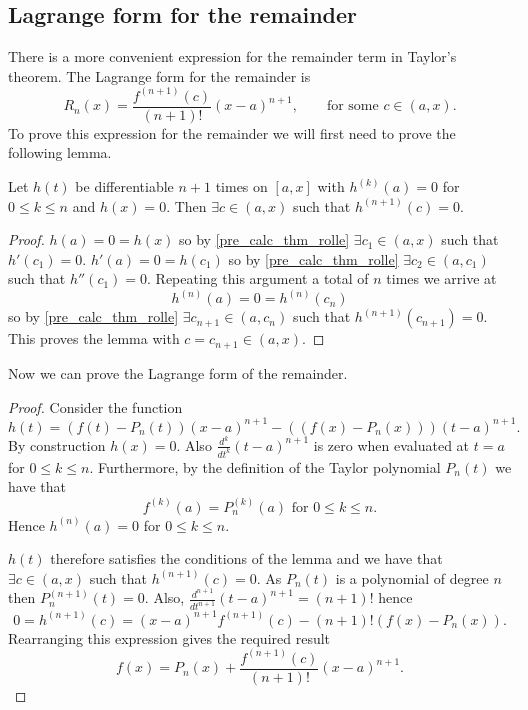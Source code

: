 \documentclass[10pt, a4paper]{article}
\begin{document}
\subsection{Lagrange form for the remainder}
There is a more convenient expression for the remainder term in Taylor's theorem.
The Lagrange form for the remainder is
\[
R_n(x) = \frac{f ^ {(n + 1)}(c)}{(n + 1)!}(x - a) ^ {n + 1},\qquad\text{for some } c \in (a, x).
\]
To prove this expression for the remainder we will first need to prove the following lemma.
\begin{lemma}
    Let $h(t)$ be differentiable $n + 1$ times on $[a, x]$ with $h ^ {(k)}(a) = 0$ for $0 \leq k \leq n$ and $h(x) = 0$.
    Then $\exists c \in (a, x)$ such that $h ^ {(n + 1)}(c) = 0$.

    \begin{proof}
        $h(a) = 0 = h(x)$ so by \autoref{pre_calc_thm_rolle} $\exists c_1 \in (a, x)$ such that $h'(c_1) = 0$.
        $h'(a) = 0 = h(c_1)$ so by \autoref{pre_calc_thm_rolle} $\exists c_2 \in (a, c_1)$ such that $h''(c_1) = 0$.
        Repeating this argument a total of $n$ times we arrive at
        \[
        h ^ {(n)}(a) = 0 = h ^ {(n)}(c_n)
        \]
        so by \autoref{pre_calc_thm_rolle} $\exists c_{n + 1} \in (a, c_n)$ such that $h ^ {(n + 1)}(c_{n + 1}) = 0$.
        This proves the lemma with $c = c_{n + 1} \in (a, x)$.
    \end{proof}
\end{lemma}

Now we can prove the Lagrange form of the remainder.
\begin{proof}
    Consider the function
    \[
    h(t) = (f(t) - P_n(t))(x - a) ^ {n + 1} - ((f(x) - P_n(x)))(t - a) ^ {n + 1}.
    \]
    By construction $h(x) = 0$.
    Also $\frac{d ^ k}{dt ^ k}(t - a) ^ {n + 1}$ is zero when evaluated at $t = a$ for $0 \leq k \leq n$.
    Furthermore,
    by the definition of the Taylor polynomial $P_n(t)$ we have that
    \[
    f ^ {(k)}(a) = P_n^{(k)}(a)\text{ for } 0 \leq k \leq n.
    \]
    Hence $h ^ {(n)}(a) = 0$ for $0 \leq k \leq n$.

    $h(t)$ therefore satisfies the conditions of the lemma and we have that $\exists c \in (a, x)$ such that $h ^ {(n + 1)}(c) = 0$.
    As $P_n(t)$ is a polynomial of degree $n$ then $P_n ^ {(n + 1)}(t) = 0$.
    Also,
    $\frac{d ^ {n + 1}}{dt ^ {n + 1}}(t - a) ^ {n + 1} = (n + 1)!$ hence
    \[
    0 = h ^ {(n + 1)}(c) = (x - a) ^ {n + 1}f ^ {(n + 1)}(c) - (n + 1)!(f(x) - P_n(x)).
    \]
    Rearranging this expression gives the required result
    \[
    f(x) = P_n(x) + \frac{f ^ {(n + 1)}(c)}{(n + 1)!}(x - a) ^ {n + 1}.
    \]
\end{proof}
\end{document}
